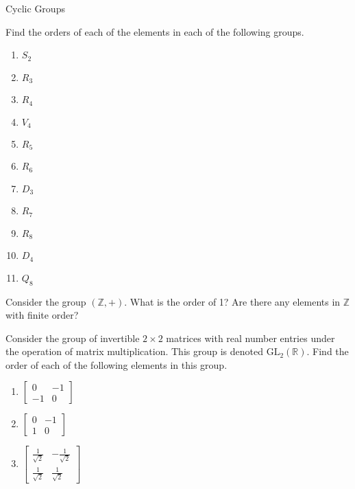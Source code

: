 \begin{section}{Cyclic Groups}
\begin{exercise}\label{exer:computing_orders}
Find the orders of each of the elements in each of the following groups.
\begin{multicols}{2}
\begin{enumerate}[label=\rm{(\alph*)}]
\item $S_2$
\item $R_3$
\item $R_4$
\item $V_4$
\item $R_5$
\item $R_6$
\item $D_3$
\item $R_7$
\item $R_8$
\item $D_4$
\item $Q_8$
\end{enumerate}
\end{multicols}
\end{exercise}

\begin{exercise}
Consider the group $(\mathbb{Z},+)$.  What is the order of 1?  Are there any elements in $\mathbb{Z}$ with finite order?
\end{exercise}

\begin{exercise}
Consider the group of invertible $2\times 2$ matrices with real number entries under the operation of matrix multiplication.  This group is denoted $\mathrm{GL}_2(\mathbb{R})$.  Find the order of each of the following elements in this group.
\begin{multicols}{3}
\begin{enumerate}[label=\rm{(\alph*)}]
\item $\begin{bmatrix} 0 & -1\\ -1 & 0\end{bmatrix}$
\item $\begin{bmatrix} 0 & -1\\ 1 & 0\end{bmatrix}$
\item $\begin{bmatrix} \frac{1}{\sqrt{2}} & -\frac{1}{\sqrt{2}}\\ \frac{1}{\sqrt{2}} & \frac{1}{\sqrt{2}}\end{bmatrix}$
\end{enumerate}
\end{multicols}
\end{exercise}


\end{section}
